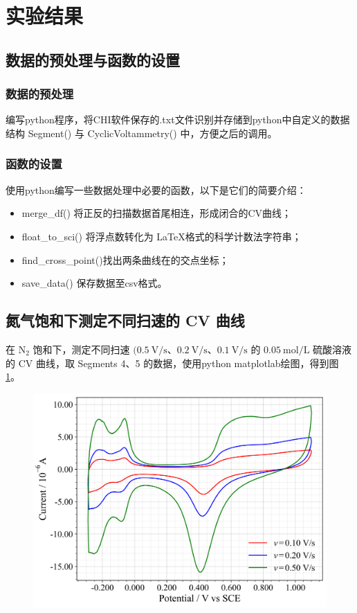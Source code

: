 \section{实验结果}

\subsection{数据的预处理与函数的设置}

\subsubsection{数据的预处理}
编写python程序，将CHI软件保存的.txt文件识别并存储到python中自定义的数据结构 Segment() 与 CyclicVoltammetry() 中，方便之后的调用。

\subsubsection{函数的设置}

使用python编写一些数据处理中必要的函数，以下是它们的简要介绍：
\begin{itemize}
    \item merge\_df() 将正反的扫描数据首尾相连，形成闭合的CV曲线；
    \item float\_to\_sci() 将浮点数转化为 \LaTeX 格式的科学计数法字符串；
    \item find\_cross\_point()找出两条曲线在的交点坐标；
    \item save\_data() 保存数据至csv格式。
\end{itemize}

\subsection{氮气饱和下测定不同扫速的 CV 曲线}

在 $\mathrm{N}_2$ 饱和下，测定不同扫速 $(0.5 \mathrm{~V} / \mathrm{s} $、$ 0.2 \mathrm{~V} / \mathrm{s} $、$ 0.1 \mathrm{~V} / \mathrm{s}$ 的 $0.05 \mathrm{~mol} / \mathrm{L}$ 硫酸溶液的 CV 曲线，取 Segments 4、5 的数据，使用python matplotlab绘图，得到图 \ref{fig:1}。

\begin{figure}[htbp]
    \centering
    \includegraphics[width=.75\textwidth]{figures2/1.png}
    \label{fig:1}
\end{figure}

